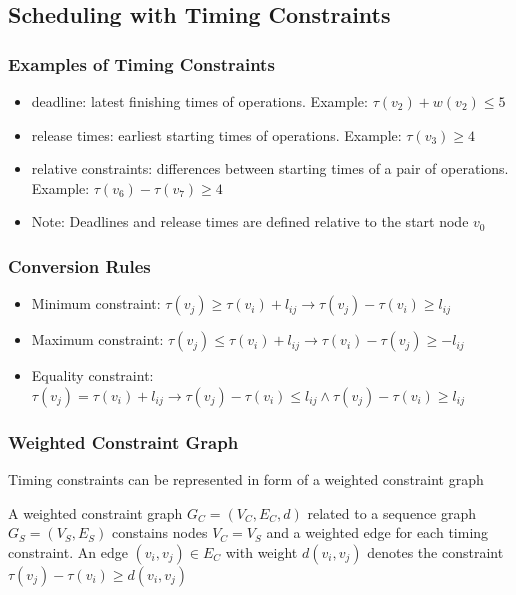 \subsection{Scheduling with Timing Constraints}

\subsubsection{Examples of Timing Constraints}
\begin{itemize}[noitemsep]
\item deadline: latest finishing times of operations. Example: $\tau(v_2) + w(v_2) \leq 5$
\item release times: earliest starting times of operations. Example: $\tau(v_3) \geq 4$
\item relative constraints: differences between starting times of a pair of operations. Example: $\tau(v_6) - \tau(v_7) \geq 4$
\item Note: Deadlines and release times are defined relative to the start node $v_0$
\end{itemize}


\subsubsection{Conversion Rules}

\begin{itemize}[noitemsep]
\item Minimum constraint: $\tau(v_j) \geq \tau(v_i) + l_{ij} \rightarrow \tau(v_j) - \tau(v_i) \geq l_{ij}$
\item Maximum constraint: $\tau(v_j) \leq \tau(v_i) + l_{ij} \rightarrow \tau(v_i) - \tau(v_j) \geq -l_{ij}$
\item Equality constraint: $\tau(v_j) = \tau(v_i) + l_{ij} \rightarrow \tau(v_j) - \tau(v_i) \leq l_{ij} \land \tau(v_j) - \tau(v_i) \geq l_{ij}$
\end{itemize}



\subsubsection{Weighted Constraint Graph}
Timing constraints can be represented in form of a weighted constraint graph

\begin{definition}
A weighted constraint graph $G_C = (V_C, E_C, d)$ related to a sequence graph $G_S = (V_S, E_S)$ constains nodes $V_C = V_S$ and a weighted edge for each timing constraint. An edge $(v_i, v_j) \in E_C$ with weight $d(v_i, v_j)$ denotes the constraint $\tau(v_j) - \tau(v_i) \geq d(v_i, v_j)$
\end{definition}

